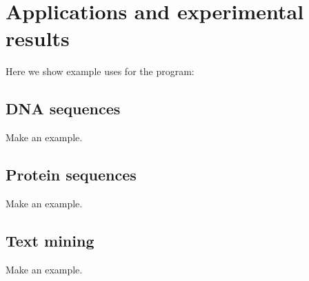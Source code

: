 \chapter{Applications and experimental results}

Here we show example uses for the program:

\section{DNA sequences}

Make an example.

\section{Protein sequences}

Make an example.

\section{Text mining}

Make an example.

